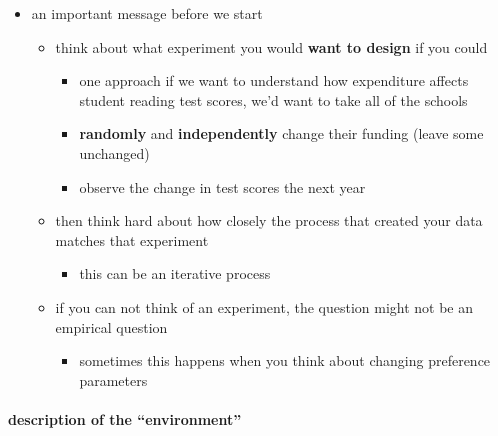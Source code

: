 \begin{itemize}
\item an important message before we start
\begin{itemize}
\item think about what experiment you would \textbf{want to design} if you
          could
\begin{itemize}
\item one approach if we want to understand how expenditure affects student
            reading test scores, we'd want to take all of the schools
\item \textbf{randomly} and \textbf{independently} change their funding (leave
            some unchanged)
\item observe the change in test scores the next year
\end{itemize}
\item then think hard about how closely the process that created
          your data matches that experiment
\begin{itemize}
\item this can be an iterative process
\end{itemize}
\item if you can not think of an experiment, the question might not
          be an empirical question
\begin{itemize}
\item sometimes this happens when you think about changing
            preference parameters
\end{itemize}
\end{itemize}
\end{itemize}
\paragraph{description of the ``environment''}
\label{sec-1-1-3}

